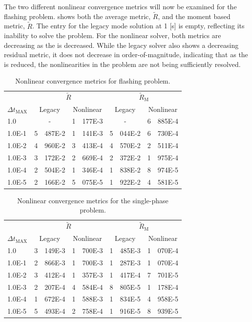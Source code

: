 The two different nonlinear convergence metrics will now be examined for the flashing problem.
 shows both the average metric, $\tilde{R}$, and the moment based metric, $\tilde{R}$.
The entry for the legacy mode solution at 1 [s] is empty, reflecting its inability to solve the problem.
For the nonlinear solver, both metrics are decreasing as the \dtmax{} is decreased.
While the legacy solver also shows a decreasing residual metric, it does not decrease in order-of-magnitude, indicating that as the \dtmax{} is reduced, the nonlinearities in the problem are not being sufficiently resolved.

\begin{table}[h!t]
\centering
\begin{tabular}{@{}l r@{.}l r@{.}l r@{.}l r@{.}l @{}}
\toprule
& \multicolumn{4}{c}{$\tilde{R}$} & \multicolumn{4}{c}{$\tilde{R}_{\text{M}}$}  \\
$\Delta t_{\text{MAX}}$ & \multicolumn{2}{c}{Legacy} & \multicolumn{2}{c}{Nonlinear} & \multicolumn{2}{c}{Legacy}& \multicolumn{2}{c}{Nonlinear}  \\
\midrule
1.0    & \multicolumn{2}{c}{-} & 1&177E-3 & \multicolumn{2}{c}{-} & 6&885E-4 \\
1.0E-1 & 5&487E-2 & 1&141E-3 & 5&044E-2 & 6&730E-4 \\
1.0E-2 & 4&960E-2 & 3&413E-4 & 4&570E-2 & 2&511E-4 \\
1.0E-3 & 3&172E-2 & 2&669E-4 & 2&372E-2 & 1&975E-4 \\
1.0E-4 & 2&504E-2 & 1&346E-4 & 1&838E-2 & 8&974E-5 \\
1.0E-5 & 2&166E-2 & 5&075E-5 & 1&922E-2 & 4&581E-5 \\
\bottomrule  
\end{tabular}
\caption{Nonlinear convergence metrics for flashing problem.}
\label{tab:flashing_criteria}
\end{table}

\begin{table}[h!t]
\centering
\begin{tabular}{@{}l r@{.}l r@{.}l r@{.}l r@{.}l @{}}
\toprule
& \multicolumn{4}{c}{$\tilde{R}$} & \multicolumn{4}{c}{$\tilde{R}_{\text{M}}$}  \\
$\Delta t_{\text{MAX}}$ & \multicolumn{2}{c}{Legacy} & \multicolumn{2}{c}{Nonlinear} & \multicolumn{2}{c}{Legacy}& \multicolumn{2}{c}{Nonlinear}  \\
\midrule
1.0    & 3&149E-3 & 1&700E-3 & 1&485E-3 & 1&070E-4 \\
1.0E-1 & 2&866E-3 & 1&700E-3 & 1&287E-3 & 1&070E-4 \\
1.0E-2 & 3&412E-4 & 1&357E-3 & 1&417E-4 & 7&701E-5 \\
1.0E-3 & 2&207E-4 & 4&584E-4 & 8&805E-5 & 1&178E-4 \\
1.0E-4 & 1&672E-4 & 1&588E-3 & 1&834E-5 & 4&958E-5 \\
1.0E-5 & 5&493E-4 & 2&758E-4 & 1&916E-5 & 8&939E-5 \\
\bottomrule  
\end{tabular}
\caption{Nonlinear convergence metrics for the single-phase problem.}
\label{tab:single_criteria}
\end{table}

